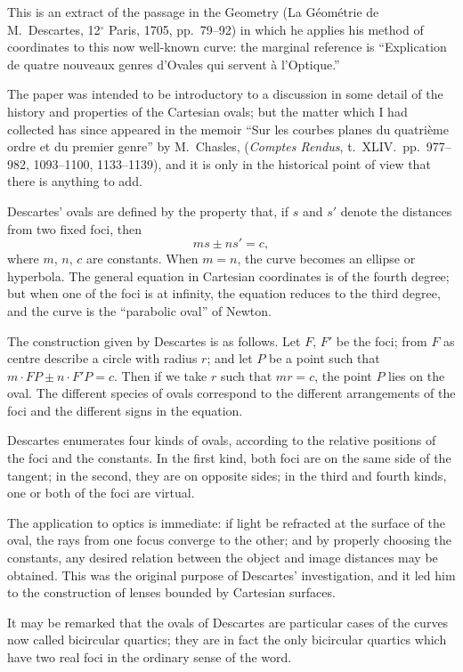 \documentclass[11pt,a4paper]{book}
\begin{document}
This is an extract of the passage in the Geometry (La G\'eom\'etrie de M.~Descartes, 12$^{\circ}$ Paris, 1705, pp.~79--92) in which he applies his method of coordinates to this now well-known curve: the marginal reference is ``Explication de quatre nouveaux genres d'Ovales qui servent \`a l'Optique.''

The paper was intended to be introductory to a discussion in some detail of the history and properties of the Cartesian ovals; but the matter which I had collected has since appeared in the memoir ``Sur les courbes planes du quatri\`eme ordre et du premier genre'' by M.~Chasles, (\textit{Comptes Rendus}, t.~XLIV.~pp.~977--982, 1093--1100, 1133--1139), and it is only in the historical point of view that there is anything to add.

Descartes' ovals are defined by the property that, if $s$ and $s'$ denote the distances from two fixed foci, then
\[
ms \pm ns' = c,
\]
where $m$, $n$, $c$ are constants. When $m=n$, the curve becomes an ellipse or hyperbola. The general equation in Cartesian coordinates is of the fourth degree; but when one of the foci is at infinity, the equation reduces to the third degree, and the curve is the ``parabolic oval'' of Newton.

The construction given by Descartes is as follows. Let $F$, $F'$ be the foci; from $F$ as centre describe a circle with radius $r$; and let $P$ be a point such that $m\cdot FP \pm n\cdot F'P = c$. Then if we take $r$ such that $mr = c$, the point $P$ lies on the oval. The different species of ovals correspond to the different arrangements of the foci and the different signs in the equation.

Descartes enumerates four kinds of ovals, according to the relative positions of the foci and the constants. In the first kind, both foci are on the same side of the tangent; in the second, they are on opposite sides; in the third and fourth kinds, one or both of the foci are virtual.

The application to optics is immediate: if light be refracted at the surface of the oval, the rays from one focus converge to the other; and by properly choosing the constants, any desired relation between the object and image distances may be obtained. This was the original purpose of Descartes' investigation, and it led him to the construction of lenses bounded by Cartesian surfaces.

It may be remarked that the ovals of Descartes are particular cases of the curves now called bicircular quartics; they are in fact the only bicircular quartics which have two real foci in the ordinary sense of the word.
\end{document}
